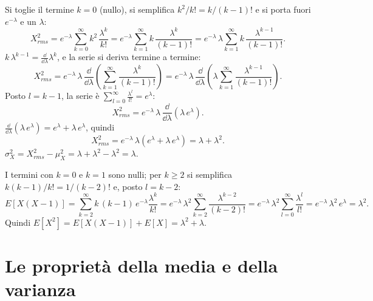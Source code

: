 \begin{dimostrazione}
 Si toglie il termine $k = 0$ (nullo), si semplifica $k^2/k! = k/(k-1)!$ e si porta fuori
$e^{-\lambda}$ e un $\lambda$:
\[
  X_{rms}^2 = e^{-\lambda} \sum_{k=0}^{\infty} k^2\, \frac{\lambda^k}{k!} = e^{-\lambda} \sum_{k=1}^{\infty}
  k\, \frac{\lambda^k}{(k-1)!} = e^{-\lambda}\, \lambda \sum_{k=1}^{\infty} k\, \frac{\lambda^{k-1}}{(k-1)!} .
\]
 $k\,\lambda^{k-1} = \frac{\dd}{\dd\lambda} \lambda^k$, e la serie si deriva
termine a termine:
\[ X_{rms}^2 = e^{-\lambda}\, \lambda\, \frac{\dd}{\dd\lambda} \left( \sum_{k=1}^{\infty} \frac{\lambda^k}{(k-1)!} \right)
   = e^{-\lambda}\, \lambda\, \frac{\dd}{\dd\lambda} \left( \lambda \sum_{k=1}^{\infty} \frac{\lambda^{k-1}}{(k-1)!}
   \right) . \]
 Posto $l = k - 1$, la serie è $\sum_{l=0}^{\infty} \frac{\lambda^l}{l!} =
e^{\lambda}$:
\[ X_{rms}^2 = e^{-\lambda}\, \lambda\, \frac{\dd}{\dd\lambda} \left( \lambda\, e^{\lambda} \right) . \]
 $\frac{\dd}{\dd\lambda}\left(\lambda\, e^{\lambda}\right) = e^{\lambda} +
\lambda\, e^{\lambda}$, quindi
\[ X_{rms}^2 = e^{-\lambda}\, \lambda \left( e^{\lambda} + \lambda\, e^{\lambda} \right) = \lambda + \lambda^2 . \]
 $\sigma_X^2 = X_{rms}^2 - \mu_X^2 = \lambda + \lambda^2 - \lambda^2 = \lambda$.
\end{dimostrazione}

\begin{dimostrazione}
\passo{} I termini con $k = 0$ e $k = 1$ sono nulli; per $k \geq 2$ si semplifica $k(k-1)/k! = 1/(k-2)!$ e, posto
$l = k - 2$:
\[
  E[X(X-1)] = \sum_{k=2}^{\infty} k\,(k-1)\, e^{-\lambda} \frac{\lambda^k}{k!}
  = e^{-\lambda}\, \lambda^2 \sum_{k=2}^{\infty} \frac{\lambda^{k-2}}{(k-2)!}
  = e^{-\lambda}\, \lambda^2 \sum_{l=0}^{\infty} \frac{\lambda^l}{l!} = e^{-\lambda}\, \lambda^2\, e^{\lambda} = \lambda^2 .
\]
\passo{} Quindi $E[X^2] = E[X(X-1)] + E[X] = \lambda^2 + \lambda$.
\end{dimostrazione}

\section{Le proprietà della media e della varianza}

